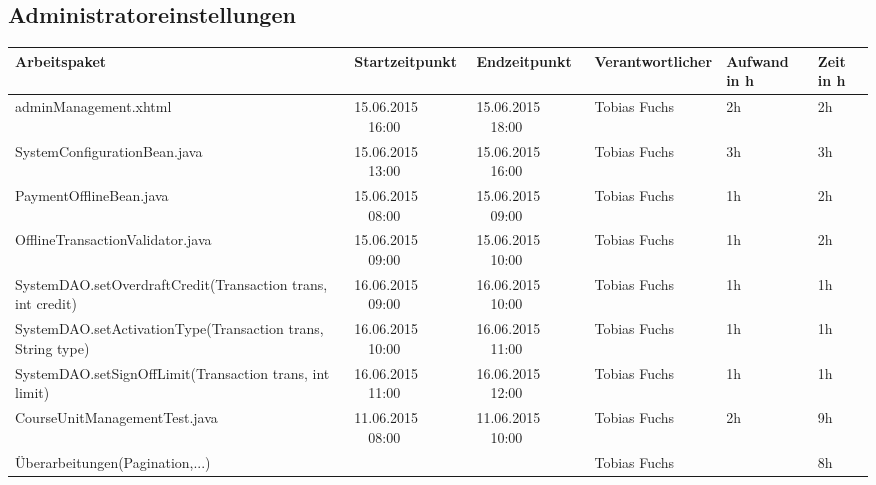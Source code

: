 \begin{landscape}
	\subsection{Administratoreinstellungen}
	\begin{tabular}{|p{10.3cm}|p{3.2cm}|p{3.2cm}|p{3.5cm}|p{1.7cm}|p{1.5cm}|}
		\hline  \textbf{Arbeitspaket} & \textbf{Startzeitpunkt} & \textbf{Endzeitpunkt} & \textbf{Verantwortlicher}  & \textbf{Aufwand in h} & \textbf{Zeit in h}\\
		\hline   adminManagement.xhtml                                 & 15.06.2015 \ \ 16:00       & 15.06.2015  \ \  18:00      & Tobias Fuchs &  2h   & 2h\\
		\hline   SystemConfigurationBean.java                          & 15.06.2015 \ \ 13:00       & 15.06.2015  \ \  16:00      & Tobias Fuchs &  3h   & 3h\\
		\hline   PaymentOfflineBean.java                               & 15.06.2015 \ \ 08:00       & 15.06.2015  \ \  09:00      & Tobias Fuchs &  1h   & 2h\\
		\hline   OfflineTransactionValidator.java                      & 15.06.2015 \ \ 09:00       & 15.06.2015  \ \  10:00      & Tobias Fuchs &  1h   & 2h\\
		\hline   SystemDAO.setOverdraftCredit(Transaction trans, int credit)  & 16.06.2015 \ \ 09:00       & 16.06.2015  \ \  10:00      & Tobias Fuchs &  1h   & 1h\\
		\hline   SystemDAO.setActivationType(Transaction trans, String type)  & 16.06.2015 \ \ 10:00       & 16.06.2015  \ \  11:00      & Tobias Fuchs &  1h   & 1h\\
		\hline   SystemDAO.setSignOffLimit(Transaction trans, int limit)      & 16.06.2015 \ \ 11:00       & 16.06.2015  \ \  12:00      & Tobias Fuchs &  1h   & 1h\\
		\hline   CourseUnitManagementTest.java                           & 11.06.2015 \ \ 08:00       & 11.06.2015  \ \  10:00       &  Tobias Fuchs &   2h     & 9h\\
		\hline   Überarbeitungen(Pagination,...)        &  &    &  Tobias Fuchs &    & 8h\\
		\hline 
	\end{tabular} \ \\
	\ \\
	

\end{landscape}
